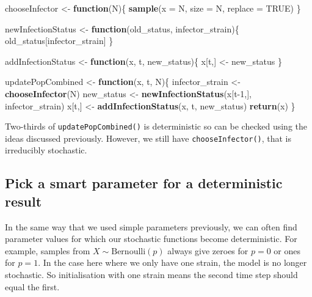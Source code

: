 \documentclass[10pt,letterpaper]{article}
\newenvironment{Shaded}{\begin{snugshade}}{\end{snugshade}}
\newcommand{\ControlFlowTok}[1]{\textcolor[rgb]{0.13,0.29,0.53}{\textbf{#1}}}
\newcommand{\DataTypeTok}[1]{\textcolor[rgb]{0.13,0.29,0.53}{#1}}
\newcommand{\DecValTok}[1]{\textcolor[rgb]{0.00,0.00,0.81}{#1}}
\newcommand{\KeywordTok}[1]{\textcolor[rgb]{0.13,0.29,0.53}{\textbf{#1}}}
\newcommand{\NormalTok}[1]{#1}
\newcommand{\OtherTok}[1]{\textcolor[rgb]{0.56,0.35,0.01}{#1}}
\newcommand{\StringTok}[1]{\textcolor[rgb]{0.31,0.60,0.02}{#1}}
\begin{document}
\begin{Shaded}
\begin{Highlighting}[]
\NormalTok{chooseInfector <-}\StringTok{ }\ControlFlowTok{function}\NormalTok{(N)\{}
  \KeywordTok{sample}\NormalTok{(}\DataTypeTok{x =}\NormalTok{ N, }\DataTypeTok{size =}\NormalTok{ N, }\DataTypeTok{replace =} \OtherTok{TRUE}\NormalTok{)}
\NormalTok{\}}

\NormalTok{newInfectionStatus <-}\StringTok{ }\ControlFlowTok{function}\NormalTok{(old_status, infector_strain)\{}
\NormalTok{  old_status[infector_strain]}
\NormalTok{\}}

\NormalTok{addInfectionStatus <-}\StringTok{ }\ControlFlowTok{function}\NormalTok{(x, t, new_status)\{}
\NormalTok{  x[t,] <-}\StringTok{ }\NormalTok{new_status}
\NormalTok{\}}

\NormalTok{updatePopCombined <-}\StringTok{ }\ControlFlowTok{function}\NormalTok{(x, t, N)\{}
\NormalTok{  infector_strain <-}\StringTok{ }\KeywordTok{chooseInfector}\NormalTok{(N)}
\NormalTok{  new_status <-}\StringTok{ }\KeywordTok{newInfectionStatus}\NormalTok{(x[t}\DecValTok{-1}\NormalTok{,], infector_strain)}
\NormalTok{  x[t,] <-}\StringTok{ }\KeywordTok{addInfectionStatus}\NormalTok{(x, t, new_status)}
  \KeywordTok{return}\NormalTok{(x)}
\NormalTok{\}}
\end{Highlighting}
\end{Shaded}

Two-thirds of \texttt{updatePopCombined()} is deterministic so can be checked using the ideas discussed previously.
However, we still have \texttt{chooseInfector()}, that is irreducibly stochastic.

\hypertarget{deterministicparams}{%
\subsection*{Pick a smart parameter for a deterministic result}\label{deterministicparams}}

In the same way that we used simple parameters previously, we can often find parameter values for which our stochastic functions become deterministic.
For example, samples from \(X\sim\text{Bernoulli}(p)\) always give zeroes for \(p=0\) or ones for \(p=1\).
In the case here where we only have one strain, the model is no longer stochastic.
So initialisation with one strain means the second time step should equal the first.
\newline
{}\label{test_stoch_determin}
\end{document}
